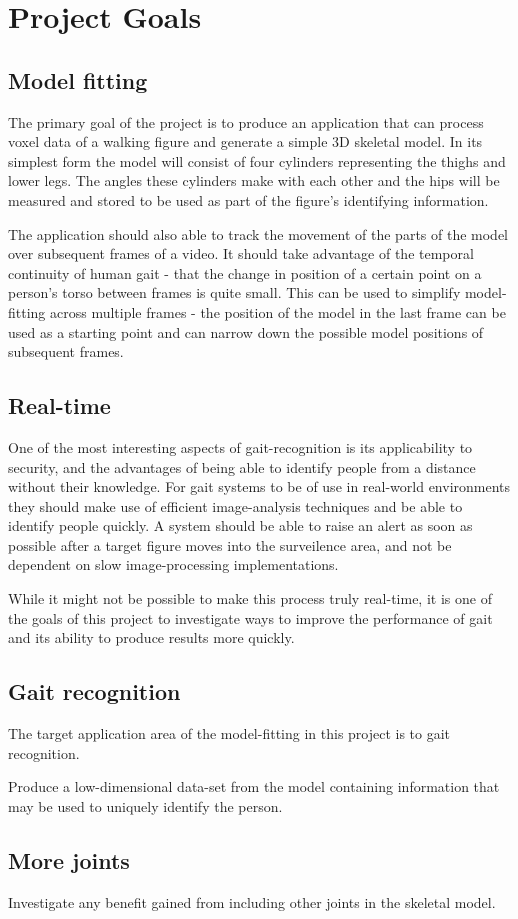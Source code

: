 \section{Project Goals}

\subsection{Model fitting}

The primary goal of the project is to produce an application that can process voxel data of a walking figure and generate a simple 3D skeletal model.
In its simplest form the model will consist of four cylinders representing the thighs and lower legs.
The angles these cylinders make with each other and the hips will be measured and stored to be used as part of the figure's identifying information.

The application should also able to track the movement of the parts of the model over subsequent frames of a video.
It should take advantage of the temporal continuity of human gait - that the change in position of a certain point on a person's torso between frames is quite small.
This can be used to simplify model-fitting across multiple frames -
the position of the model in the last frame can be used as a starting point and can narrow down the possible model positions of subsequent frames.


\subsection{Real-time}

One of the most interesting aspects of gait-recognition is its applicability to security, and the advantages of being able to identify people from a distance without their knowledge.
For gait systems to be of use in real-world environments they should make use of efficient image-analysis techniques and be able to identify people quickly.
A system should be able to raise an alert as soon as possible after a target figure moves into the surveilence area, and not be dependent on slow image-processing implementations.

While it might not be possible to make this process truly real-time, it is one of the goals of this project to investigate ways to improve the performance of gait and its ability to produce results more quickly.


\subsection{Gait recognition}

The target application area of the model-fitting in this project is to gait recognition.

Produce a low-dimensional data-set from the model containing information that may be used to uniquely identify the person.

\subsection{More joints}

Investigate any benefit gained from including other joints in the skeletal model.
